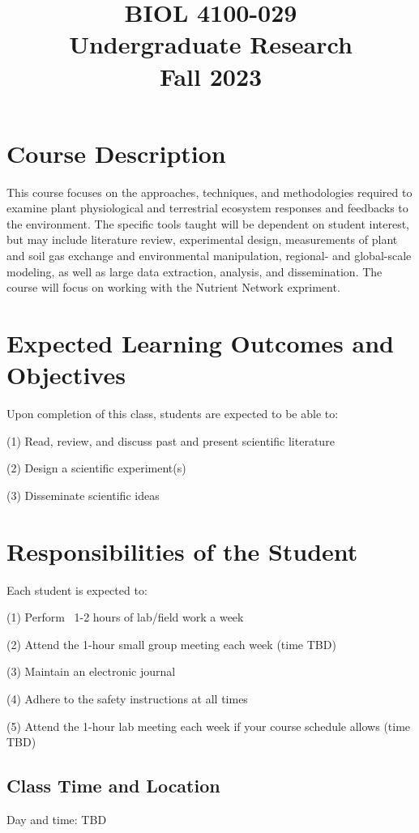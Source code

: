 \documentclass[12pt, notitlepage]{article}   	%
\title{
	\textbf{
		BIOL 4100-029
	} \\
	\large Undergraduate Research \\
	\large Fall 2023
}
\date{\vspace{-5ex}}
\begin{document}
{\selectfont %

\maketitle

\section{Course Description}
This course focuses on the approaches, techniques, and methodologies required to examine 
plant physiological and terrestrial ecosystem responses and feedbacks to the environment. 
The specific tools taught will be dependent on student interest, 
but may include literature review, experimental design, measurements of plant and soil gas 
exchange and environmental manipulation, regional- and global-scale modeling, 
as well as large data extraction, analysis, and dissemination. The course will focus on
working with the Nutrient Network expriment.

\section{Expected Learning Outcomes and Objectives}
Upon completion of this class, students are expected to be able to:\par
(1)	Read, review, and discuss past and present scientific literature\par
(2) Design a scientific experiment(s)\par
(3) Disseminate scientific ideas\par

\section{Responsibilities of the Student}
Each student is expected to:\par
(1) Perform ~1-2 hours of lab/field work a week\par
(2) Attend the 1-hour small group meeting each week (time TBD)\par
(3) Maintain an electronic journal\par
(4) Adhere to the safety instructions at all times\par
(5) Attend the 1-hour lab meeting each week if your course schedule allows (time TBD)\par

\subsection{Class Time and Location}
Day and time: TBD

}
\end{document}
